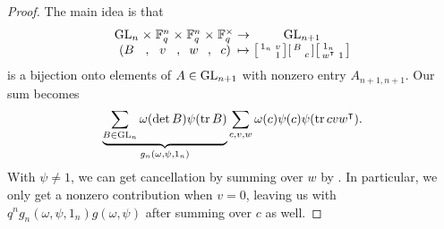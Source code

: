 \begin{proof}
    The main idea is that
    \[\arraycolsep=1.4pt\begin{array}{ccccccccc}
        \GL_n &\times& \FF_q^n &\times& \FF_q^n &\times& \FF_q^\times &\to& \GL_{n+1} \\
        (B &,& v &,& w &,& c) &\mapsto& \begin{bsmallmatrix}
            1_n & v \\
            & 1
        \end{bsmallmatrix}\begin{bsmallmatrix}
            B \\ & c
        \end{bsmallmatrix}\begin{bsmallmatrix}
            1_n \\
            w^\intercal & 1
        \end{bsmallmatrix}
    \end{array}\]
    is a bijection onto elements of $A\in\mathrm{GL}_{n+1}$ with nonzero entry $A_{n+1,n+1}$.
    Our sum becomes
    \[\underbrace{\sum_{B\in\mathrm{GL}_n}\omega(\det B)\psi(\operatorname{tr} B)}_{g_n(\omega,\psi,1_n)}\sum_{c,v,w}\omega(c)\psi(c)\psi(\operatorname{tr} cvw^\intercal).\]
    With $\psi\ne1$, we can get cancellation by summing over $w$
    by . In particular, we only get a nonzero contribution when $v=0$, leaving us with $q^ng_n(\omega,\psi,1_n)g(\omega,\psi)$
    after summing over $c$ as well.
\end{proof}
